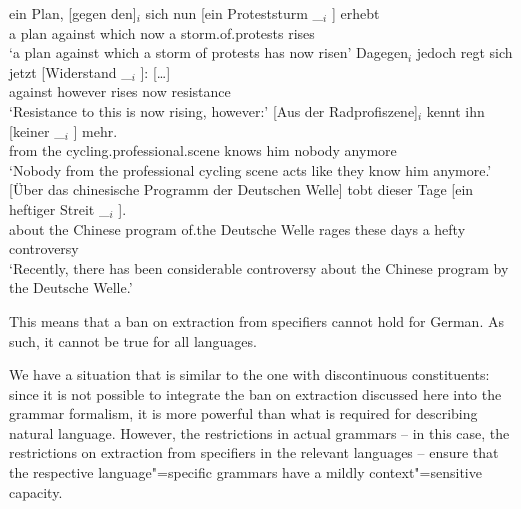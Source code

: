 \begin{sloppypar}
\ex 
\gll ein Plan, [gegen den]$_i$ sich nun [ein Proteststurm \_$_i$ ] erhebt\footnotemark\\
     a plan \spacebr{}against which \REFL{} now \spacebr{}a storm.of.protests {} {} rises\\
\glt `a plan against which a storm of protests has now risen'
\ex 
\gll {}Dagegen$_i$ jedoch regt sich jetzt [Widerstand \_$_i$ ]: [\ldots]\footnotemark\\
	{}against however rises \REFL{} now \spacebr{}resistance {}\\
\glt `Resistance to this is now rising, however:'
\largerpage[2]
\ex
\gll {}[Aus der Radprofiszene]$_i$ kennt ihn [keiner \_$_i$ ] mehr.\footnotemark\\
	 {}\spacebr{}from the cycling.professional.scene knows him \spacebr{}nobody {} {} anymore\\
\glt `Nobody from the professional cycling scene acts like they know him anymore.'
\ex 
\gll {}[Über das chinesische Programm der Deutschen Welle] tobt dieser Tage [ein heftiger Streit \_$_i$ ].\footnotemark\\
     \spacebr{}about the Chinese program of.the Deutsche Welle rages these days \spacebr{}a hefty controversy\\
\glt `Recently, there has been considerable controversy about the Chinese program by the Deutsche Welle.'
\zl
\end{sloppypar}

\noindent
This means that a ban on extraction from specifiers cannot hold for German. As such, it cannot be true for all languages.

We have a situation that is similar to the one with discontinuous constituents: since it is not possible to integrate
the ban on extraction discussed here into the grammar formalism, it is more powerful than what is required
for describing natural language. However, the restrictions in actual grammars -- in this case, the restrictions on
extraction from specifiers in the relevant languages -- ensure that the respective
language"=specific grammars have a mildly context"=sensitive capacity.



